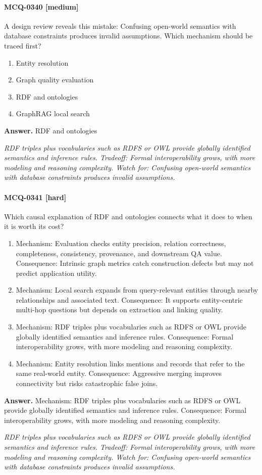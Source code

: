 \paragraph{MCQ-0340 [medium]} A design review reveals this mistake: Confusing open-world semantics with database constraints produces invalid assumptions. Which mechanism should be traced first?
\begin{enumerate}[label=\Alph*.]
\item Entity resolution
\item Graph quality evaluation
\item RDF and ontologies
\item GraphRAG local search
\end{enumerate}
\noindent\textbf{Answer.} RDF and ontologies
\par\textit{RDF triples plus vocabularies such as RDFS or OWL provide globally identified semantics and inference rules. Tradeoff: Formal interoperability grows, with more modeling and reasoning complexity. Watch for: Confusing open-world semantics with database constraints produces invalid assumptions.}
\paragraph{MCQ-0341 [hard]} Which causal explanation of RDF and ontologies connects what it does to when it is worth its cost?
\begin{enumerate}[label=\Alph*.]
\item Mechanism: Evaluation checks entity precision, relation correctness, completeness, consistency, provenance, and downstream QA value. Consequence: Intrinsic graph metrics catch construction defects but may not predict application utility.
\item Mechanism: Local search expands from query-relevant entities through nearby relationships and associated text. Consequence: It supports entity-centric multi-hop questions but depends on extraction and linking quality.
\item Mechanism: RDF triples plus vocabularies such as RDFS or OWL provide globally identified semantics and inference rules. Consequence: Formal interoperability grows, with more modeling and reasoning complexity.
\item Mechanism: Entity resolution links mentions and records that refer to the same real-world entity. Consequence: Aggressive merging improves connectivity but risks catastrophic false joins.
\end{enumerate}
\noindent\textbf{Answer.} Mechanism: RDF triples plus vocabularies such as RDFS or OWL provide globally identified semantics and inference rules. Consequence: Formal interoperability grows, with more modeling and reasoning complexity.
\par\textit{RDF triples plus vocabularies such as RDFS or OWL provide globally identified semantics and inference rules. Tradeoff: Formal interoperability grows, with more modeling and reasoning complexity. Watch for: Confusing open-world semantics with database constraints produces invalid assumptions.}
